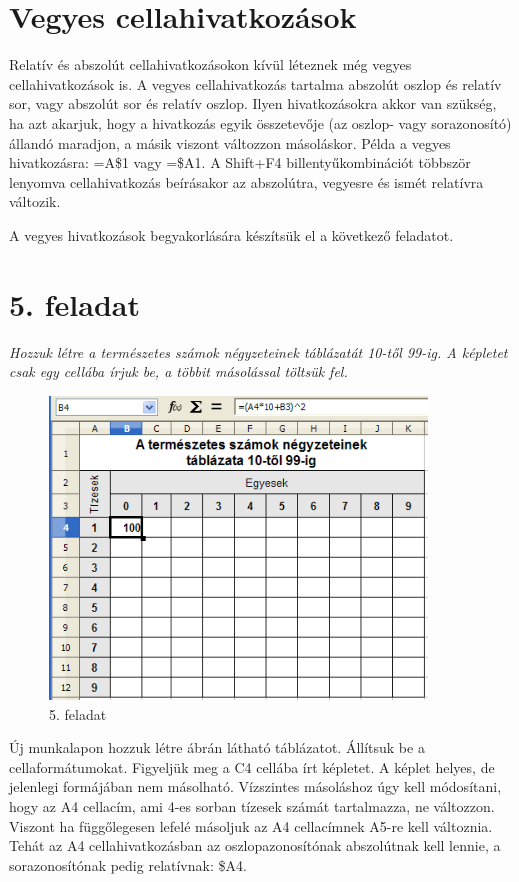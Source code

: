 \section{Vegyes cellahivatkozások}

Relatív és abszolút cellahivatkozásokon kívül léteznek
még vegyes cellahivatkozások is. A vegyes cellahivatkozás
tartalma abszolút oszlop és relatív sor, vagy abszolút sor és
relatív oszlop. Ilyen hivatkozásokra akkor van szükség, ha azt
akarjuk, hogy a hivatkozás egyik összetevője (az oszlop- vagy
sorazonosító) állandó maradjon, a másik viszont változzon
másoláskor. Példa a vegyes hivatkozásra: =A\$1 vagy =\$A1. A
Shift+F4 billentyűkombinációt többször lenyomva
cellahivatkozás beírásakor az abszolútra, vegyesre és ismét
relatívra változik.

A vegyes hivatkozások begyakorlására készítsük el a
következő feladatot.

\section{5. feladat}
{\itshape
Hozzuk létre a természetes számok négyzeteinek táblázatát
10-től 99-ig. A képletet csak egy cellába írjuk be, a
többit másolással töltsük fel.}

\begin{figure}[!h]
\begin{center}
\includegraphics[width=10.037cm]{oocalcv2-img27.png}
\caption{5. feladat}\label{5-feladat}
\end{center}
\end{figure}

Új munkalapon hozzuk létre  ábrán látható
táblázatot. Állítsuk be a cellaformátumokat. Figyeljük meg
a C4 cellába írt képletet. A képlet helyes, de jelenlegi
formájában nem másolható. Vízszintes másoláshoz úgy
kell módosítani, hogy az A4 cellacím, ami 4-es sorban tízesek
számát tartalmazza, ne változzon. Viszont ha függőlegesen
lefelé másoljuk az A4 cellacímnek A5-re kell  változnia.
Tehát az A4 cellahivatkozásban az oszlopazonosítónak
abszolútnak kell lennie, a sorazonosítónak pedig relatívnak: \$A4.

